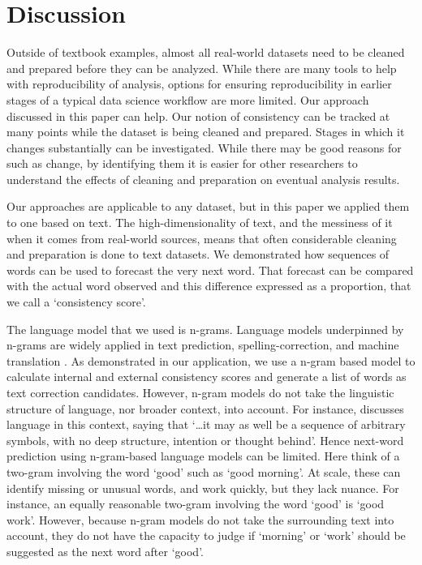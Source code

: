 \documentclass[11pt,]{article}
\begin{document}
\hypertarget{discussion}{%
\section{Discussion}\label{discussion}}

Outside of textbook examples, almost all real-world datasets need to be cleaned and prepared before they can be analyzed. While there are many tools to help with reproducibility of analysis, options for ensuring reproducibility in earlier stages of a typical data science workflow are more limited. Our approach discussed in this paper can help. Our notion of consistency can be tracked at many points while the dataset is being cleaned and prepared. Stages in which it changes substantially can be investigated. While there may be good reasons for such as change, by identifying them it is easier for other researchers to understand the effects of cleaning and preparation on eventual analysis results.

Our approaches are applicable to any dataset, but in this paper we applied them to one based on text. The high-dimensionality of text, and the messiness of it when it comes from real-world sources, means that often considerable cleaning and preparation is done to text datasets. We demonstrated how sequences of words can be used to forecast the very next word. That forecast can be compared with the actual word observed and this difference expressed as a proportion, that we call a `consistency score'.

The language model that we used is n-grams. Language models underpinned by n-grams are widely applied in text prediction, spelling-correction, and machine translation \citep{brown1992class}. As demonstrated in our application, we use a n-gram based model to calculate internal and external consistency scores and generate a list of words as text correction candidates. However, n-gram models do not take the linguistic structure of language, nor broader context, into account. For instance, \citet[p.~1]{rosenfeld2000two} discusses language in this context, saying that `\ldots it may as well be a sequence of arbitrary symbols, with no deep structure, intention or thought behind'. Hence next-word prediction using n-gram-based language models can be limited. Here think of a two-gram involving the word `good' such as `good morning'. At scale, these can identify missing or unusual words, and work quickly, but they lack nuance. For instance, an equally reasonable two-gram involving the word `good' is `good work'. However, because n-gram models do not take the surrounding text into account, they do not have the capacity to judge if `morning' or `work' should be suggested as the next word after `good'.
\end{document}
